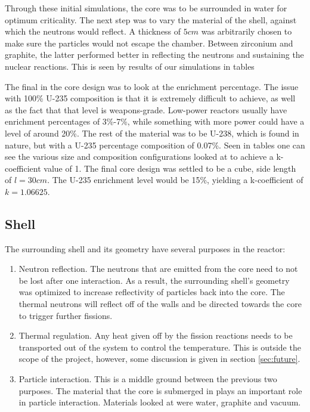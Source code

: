 Through these initial simulations, the core was to be surrounded in water for optimum criticality. The next step was to vary the material of the shell, against which the neutrons would reflect. A thickness of $5cm$ was arbitrarily chosen to make sure the particles would not escape the chamber. Between zirconium and graphite, the latter performed better in reflecting the neutrons and sustaining the nuclear reactions. This is seen by results of our simulations in tables %

The final in the core design was to look at the enrichment percentage. The issue with 100\% U-235 composition is that it is extremely difficult to achieve, as well as the fact that that level is weapons-grade. Low-power reactors usually have enrichment percentages of 3\%-7\%, while something with more power could have a level of around 20\%. The rest of the material was to be U-238, which is found in nature, but with a U-235 percentage composition of 0.07\%. Seen in tables %
one can see the various size and composition configurations looked at to achieve a k-coefficient value of 1. The final core design was settled to be a cube, side length of $l=30cm$. The U-235 enrichment level would be 15\%, yielding a k-coefficient of $k=1.06625$.
\subsection{Shell}

The surrounding shell and its geometry have several purposes in the reactor:
\begin{enumerate}
	\item Neutron reflection. The neutrons that are emitted from the core need to not be lost after one interaction. As a result, the surrounding shell's geometry was optimized to increase reflectivity of particles back into the core. The thermal neutrons will reflect off of the walls and be directed towards the core to trigger further fissions.
	\item Thermal regulation. Any heat given off by the fission reactions needs to be transported out of the system to control the temperature. This is outside the scope of the project, however, some discussion is given in section \ref{sec:future}.
	\item Particle interaction. This is a middle ground between the previous two purposes. The material that the core is submerged in plays an important role in particle interaction. Materials looked at were water, graphite and vacuum.
\end{enumerate}

